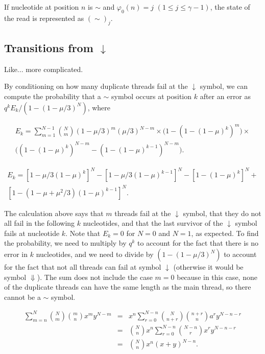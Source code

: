 \documentclass{article}
\newcommand{\DN}{\scriptstyle{\Downarrow}}
\newcommand{\dn}{\scriptstyle{\downarrow}}
\newcommand{\eqg}{\scriptstyle{\sim}}
\begin{document}
If nucleotide at position $n$ is $\sim$ and $\varphi_0(n) = j$ $(1 \leq j
\leq \gamma-1)$, the state of the read is represented as $(\sim)_j$.


\subsection{Transitions from $\downarrow$}

Like... more complicated.


By conditioning on how many duplicate threads fail at the $\dn$ symbol, we
can compute the probability that a $\eqg$ symbol occurs at position $k$
after an error as $q^kE_k / (1-(1-\mu/3)^N)$, where

\begin{equation*}
\begin{split}
E_k = \sum_{m=1}^{N-1} {N \choose m} (1-\mu/3)^m (\mu/3)^{N-m} \times
\Big( 1 - (1-(1-\mu)^k)^m \Big) \times \\
\Big( (1-(1-\mu)^k)^{N-m} - (1-(1-\mu)^{k-1})^{N-m} \Big).
\end{split}
\end{equation*}

\begin{equation*}
\begin{split}
E_k = [1-\mu/3(1-\mu)^k]^N - [1-\mu/3(1-\mu)^{k-1}]^N
-[1-(1-\mu)^k]^N + \\
[1-(1-\mu+\mu^2/3)(1-\mu)^{k-1}]^N.
\end{split}
\end{equation*}

The calculation above says that $m$ threads fail at the $\dn$ symbol, that
they do not all fail in the following $k$ nucleotides, and that the last
survivor of the $\dn$ symbol fails at nucleotide $k$. Note that $E_k=0$
for $N=0$ and $N=1$, as expected. To find the probability, we need to
multiply by $q^k$ to account for the fact that there is no error in $k$
nucleotides, and we need to divide by $(1-(1-\mu/3)^N)$ to account for the
fact that not all threads can fail at symbol $\dn$ (otherwise it would be
symbol $\DN$). The sum does not include the case $m=0$ because in this
case, none of the duplicate threads can have the same length as the main
thread, so there cannot be a $\eqg$ symbol.

\begin{eqnarray*}
\sum_{m=n}^N {N \choose m} {m \choose n} x^m y^{N-m}
&=& x^n \sum_{r=0}^{N-n} {N \choose n+r} {n+r \choose n}a^r y^{N-n-r} \\
&=& {N \choose n} x^n \sum_{r=0}^{N-n} {N-n \choose r}x^r y^{N-n-r} \\
&=& {N \choose n} x^n (x+y)^{N-n}.
\end{eqnarray*}
\end{document}
